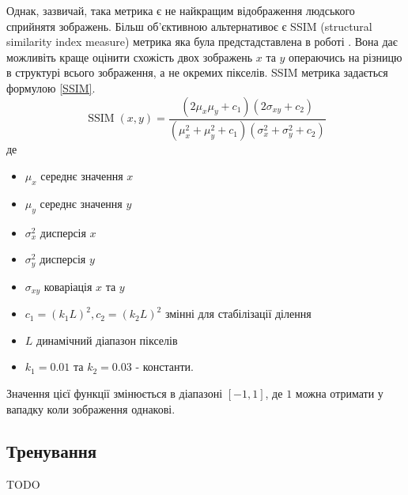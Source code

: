\documentclass[14pt,a4paper]{extarticle}
\newcounter{e}
\numberwithin{equation}{section}
\numberwithin{figure}{section}
\begin{document}
	Однак, зазвичай, така метрика є не найкращим відображення людського сприйнятя зображень. Більш об'єктивною альтернативоє є SSIM (structural similarity index measure) метрика яка була предстадставлена в роботі \cite{1284395}. Вона дає можливіть краще оцінити схожість двох зображень $x$ та $y$ операючись на різницю в структурі всього зображення, а не окремих пікселів. SSIM метрика задається формулою \ref{SSIM}.
	\begin{equation}
		\label{SSIM}
		\operatorname{SSIM}(x, y)=\frac{\left(2 \mu_{x} \mu_{y}+c_{1}\right)\left(2 \sigma_{x 	y}+c_{2}\right)}{\left(\mu_{x}^{2}+\mu_{y}^{2}+c_{1}\right)\left(\sigma_{x}^{2}+\sigma_{y}^{2}+c_{2}\right)}
	\end{equation}
	де
	\begin{itemize}
		\item $\mu_{x}$ середнє значення $x$
		\item $\mu_{y}$ середнє значення $y$
		\item $\sigma_{x}^{2}$ дисперсія $x$
		\item $\sigma_{y}^{2}$ дисперсія  $y$
		\item $\sigma_{x y}$ коваріація $x$ та $y$
		\item $c_{1}=\left(k_{1} L\right)^{2}, c_{2}=\left(k_{2} L\right)^{2}$ змінні для стабілізації ділення
		\item $L$ динамічний діапазон пікселів
		\item $k_{1}=0.01$ та $k_{2}=0.03$ - константи.	
	\end{itemize}
	
	Значення цієї функції змінюється в діапазоні $[-1, 1]$, де $1$ можна отримати у вападку коли зображення однакові.
			
	
	\subsection{Тренування}
	TODO
	
\end{document}
